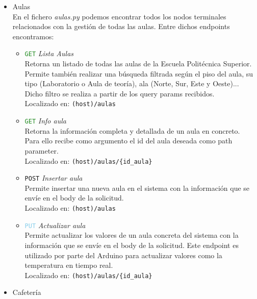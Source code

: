 \documentclass[12pt]{report}
\begin{document}
\begin{itemize}
    \item Aulas\\
     En el fichero \textit{aulas.py} podemos encontrar todos los nodos terminales relacionados con la gestión de todas las aulas.
    Entre dichos endpoints encontramos:
        \begin{itemize}
        \item \textcolor{ForestGreen}{\texttt{GET}} \textit{Lista Aulas}\\
        Retorna un listado de todas las aulas de la Escuela Politécnica Superior. Permite también realizar una búsqueda filtrada según el piso del aula, su tipo (Laboratorio o Aula de teoría), ala (Norte, Sur, Este y Oeste)... Dicho filtro se realiza a partir de los query params recibidos.\\
        Localizado en: \texttt{(host)/aulas}
        \item \textcolor{ForestGreen}{\texttt{GET}} \textit{Info aula}\\
        Retorna la información completa y detallada de un aula en concreto.\\
        Para ello recibe como argumento el id del aula deseada como path parameter.\\
        Localizado en: \texttt{(host)/aulas/\{id\_aula\}}
        \item \textcolor{YellowOrange}{\texttt{POST}} \textit{Insertar aula}\\
        Permite insertar una nueva aula en el sistema con la información que se envíe en el body de la solicitud.
        \\Localizado en: \texttt{(host)/aulas}
        \item \textcolor{SkyBlue}{\texttt{PUT}}
        \textit{Actualizar aula}\\
        Permite actualizar los valores de un aula concreta del sistema con la información que se envíe en el body de la solicitud. Este endpoint es utilizado por parte del Arduino para actualizar valores como la temperatura en tiempo real.
        \\Localizado en: \texttt{(host)/aulas/\{id\_aula\}}
        
    \end{itemize}
    \item Cafetería
    
\end{itemize}

\end{document}
